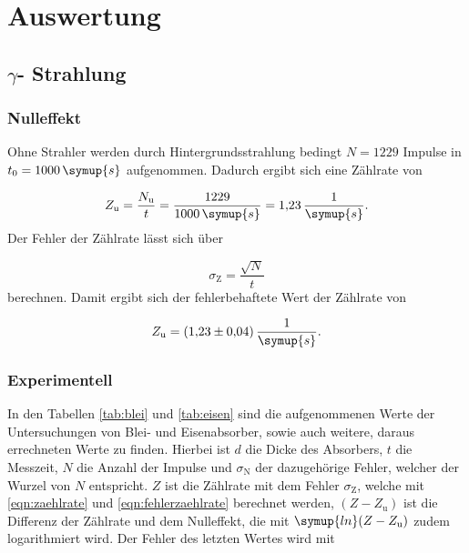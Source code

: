 \section{Auswertung}
\subsection{{\texorpdfstring{$\gamma$}{Gamma}}- Strahlung}
\subsubsection{Nulleffekt}
Ohne Strahler werden durch Hintergrundsstrahlung bedingt $N = 1229$ Impulse in $t_0 = 1000\,\symup{s}$ aufgenommen. Dadurch ergibt sich eine Zählrate von

\begin{equation}
Z_{\text{u}} = \frac{N_{\text{u}}}{t} = \frac{1229}{1000\,\symup{s}} = 1{,}23\,\frac{1}{\symup{s}}.
\label{eqn:zaehlrate}
\end{equation}
Der Fehler der Zählrate lässt sich über

\begin{equation}
\sigma_{\text{Z}} = \frac{\sqrt{N}}{t}
\label{eqn:fehlerzaehlrate}
\end{equation}
berechnen. Damit ergibt sich der fehlerbehaftete Wert der Zählrate von 

\begin{equation*}
Z_{\text{u}} =  (1{,}23 \pm 0{,}04)\,\frac{1}{\symup{s}}.
\end{equation*}







\subsubsection{Experimentell}
In den Tabellen \ref{tab:blei} und \ref{tab:eisen} sind die aufgenommenen Werte der Untersuchungen von Blei- und Eisenabsorber, sowie auch weitere, daraus errechneten Werte zu finden. Hierbei ist $d$ die Dicke des Absorbers, $t$ die Messzeit, $N$ die Anzahl
der Impulse und $\sigma_{\text{N}}$ der dazugehörige Fehler, welcher der Wurzel von $N$ entspricht. $Z$ ist die Zählrate mit dem Fehler $\sigma_{\text{Z}}$, welche mit \ref{eqn:zaehlrate} und \ref{eqn:fehlerzaehlrate} berechnet werden, $(Z - Z_{\text{u}})$
ist die Differenz der Zählrate und dem Nulleffekt, die mit $\symup{ln}(Z - Z_{\text{u}})$ zudem logarithmiert wird. Der Fehler des letzten Wertes wird mit

